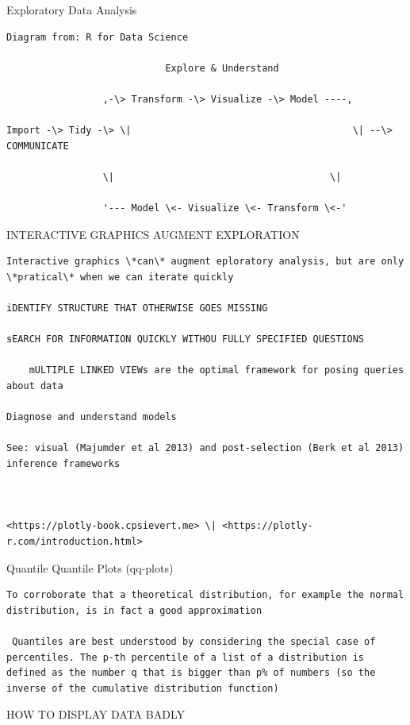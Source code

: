 \documentclass[
]{book}
\begin{document}
Exploratory Data Analysis

\begin{verbatim}
Diagram from: R for Data Science

                            Explore & Understand

                 ,-\> Transform -\> Visualize -\> Model ----,

Import -\> Tidy -\> \|                                       \| --\> COMMUNICATE

                 \|                                      \|

                 '--- Model \<- Visualize \<- Transform \<-'
\end{verbatim}

INTERACTIVE GRAPHICS AUGMENT EXPLORATION

\begin{verbatim}
Interactive graphics \*can\* augment eploratory analysis, but are only \*pratical\* when we can iterate quickly

iDENTIFY STRUCTURE THAT OTHERWISE GOES MISSING

sEARCH FOR INFORMATION QUICKLY WITHOU FULLY SPECIFIED QUESTIONS

    mULTIPLE LINKED VIEWs are the optimal framework for posing queries about data

Diagnose and understand models

See: visual (Majumder et al 2013) and post-selection (Berk et al 2013) inference frameworks



<https://plotly-book.cpsievert.me> \| <https://plotly-r.com/introduction.html>
\end{verbatim}

Quantile Quantile Plots (qq-plots)

\begin{verbatim}
To corroborate that a theoretical distribution, for example the normal distribution, is in fact a good approximation

 Quantiles are best understood by considering the special case of percentiles. The p-th percentile of a list of a distribution is defined as the number q that is bigger than p% of numbers (so the inverse of the cumulative distribution function)
\end{verbatim}

HOW TO DISPLAY DATA BADLY
\end{document}
